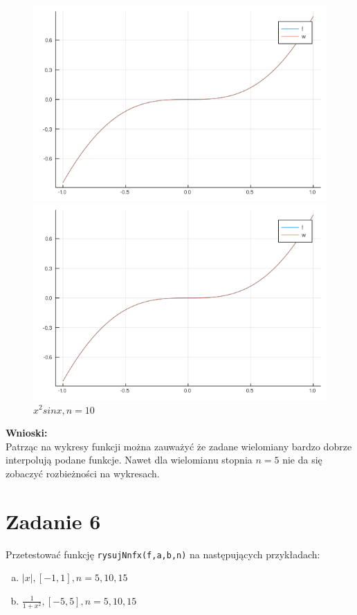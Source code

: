 \documentclass[12pt]{article}
\begin{document}
\begin{figure}[!htb]
  \includegraphics[width=\linewidth]{myplot_2_10.png}
  \caption{$x^2sin x, n=5$}
\endminipage\hfill
{}
  \includegraphics[width=\linewidth]{myplot_2_15.png}
  \caption{$x^2sin x, n=10$}
\endminipage
\end{figure}



\clearpage
\noindent \textbf{Wnioski:}\\
Patrząc na wykresy funkcji można zauważyć że zadane wielomiany bardzo dobrze interpolują podane funkcje. Nawet dla wielomianu stopnia $n=5$ nie da się zobaczyć rozbieżności na wykresach.

\section{Zadanie 6}
Przetestować funkcję \texttt{rysujNnfx(f,a,b,n)} na następujących przykładach:
\begin{enumerate}[(a)]
	\item $|x|, [-1,1], n=5,10,15$
	\item $\frac{1}{1+x^2}, [-5, 5], n=5,10,15$
\end{enumerate}
\end{document}
